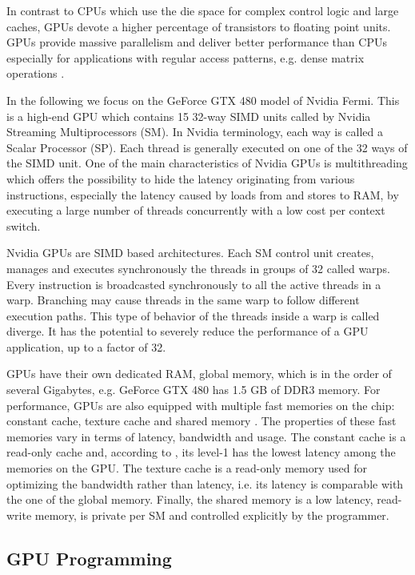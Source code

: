 In contrast to CPUs which use the die space for complex control logic and large
caches, GPUs devote a higher percentage of transistors to floating point units.
GPUs provide massive parallelism and deliver better performance than CPUs
especially for applications with regular access patterns, e.g. dense matrix
operations \cite{vol2008}.

In the following we focus on the GeForce GTX 480 model of Nvidia Fermi.
This is a high-end GPU which contains 15 32-way SIMD units called by Nvidia
Streaming Multiprocessors (SM). In Nvidia terminology, each way is called a
Scalar Processor (SP). Each thread is generally executed on one of the 32 ways
of the SIMD unit. One of the main characteristics of Nvidia GPUs is multithreading
which offers the possibility to hide the latency originating from various
instructions, especially the latency caused by loads from and stores to RAM, by
executing a large number of threads concurrently with a low cost per context
switch.

Nvidia GPUs are SIMD based architectures. Each SM control unit creates, manages
and executes synchronously the threads in groups of 32 called warps. Every
instruction is broadcasted synchronously to all the active threads in a warp.
Branching may cause threads in the same warp to follow different execution
paths. This type of behavior of the threads inside a warp is called diverge. It
has the potential to severely reduce the performance of a GPU application, up to
a factor of 32.

GPUs have their own dedicated RAM, global memory, which is in the order of
several Gigabytes, e.g. GeForce GTX 480 has 1.5 GB of DDR3 memory. For
performance, GPUs are also equipped with multiple fast memories on the chip:
constant cache, texture cache and shared memory \cite{ryo2008}. The properties
of these fast memories vary in terms of latency, bandwidth and usage. The
constant cache is a read-only cache and, according to \cite{won2010}, its
level-1 has the lowest latency among the memories on the GPU. The texture cache
is a read-only memory used for optimizing the bandwidth rather than latency,
i.e. its latency is comparable with the one of the global memory. Finally, the
shared memory is a low latency, read-write memory, is private per SM and
controlled explicitly by the programmer.


\subsection{GPU Programming}

